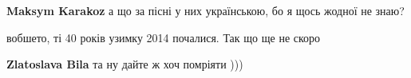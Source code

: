 \begin{itemize}
\begin{itemize}
\textbf{Maksym Karakoz} а що за пісні у них українською, бо я щось жодної не знаю?
\end{itemize}

 
вобшето, ті 40 років узимку 2014 почалися. Так що ще не скоро

\begin{itemize}
 
\textbf{Zlatoslava Bila} та ну дайте ж хоч помріяти )))
\end{itemize}

\end{itemize}

